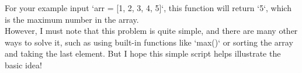 \documentclass[preview]{standalone}
\begin{document}
For your example input `arr = [1, 2, 3, 4, 5]`, this function will return `5`, which is the maximum number in the array.\\However, I must note that this problem is quite simple, and there are many other ways to solve it, such as using built-in functions like `max()` or sorting the array and taking the last element. But I hope this simple script helps illustrate the basic idea!\\
\end{document}
